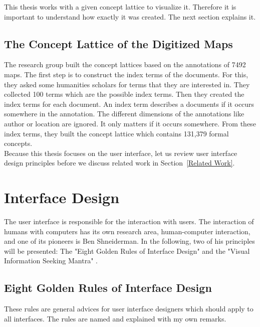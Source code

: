 \documentclass[11pt]{report}
\begin{document}
This thesis works with a given concept lattice to visualize it. Therefore it is important to understand how exactly it was created. The next section explains it.

\subsection{The Concept Lattice of the Digitized Maps}
\label{thedata}

The research group built the concept lattices based on the annotations of 7492 maps. The first step is to construct the index terms of the documents. For this, they asked some humanities scholars for terms that they are interested in. They collected 100 terms which are the possible index terms. Then they created the index terms for each document. An index term describes a documents if it occurs somewhere in the annotation. The different dimensions of the annotations like author or location are ignored. It only matters if it occurs somewhere. From these index terms, they built the concept lattice which contains 131,379 formal concepts.\\

Because this thesis focuses on the user interface, let us review user interface design principles before we discuss related work in Section~\ref{Related Work}.

\section{Interface Design}
\label{id}

The user interface is responsible for the interaction with users. The interaction of humans with computers has its own research area, human-computer interaction, and one of its pioneers is Ben Shneiderman. In the following, two of his principles will be presented: The "Eight Golden Rules of Interface Design" \cite{Shneiderman2010} and the "Visual Information Seeking Mantra" \cite{Shneiderman1996}.

\subsection{Eight Golden Rules of Interface Design}
\label{Golden}

These rules \cite{Shneiderman2010} are general advices for user interface designers which should apply to all interfaces. The rules are named and explained with my own remarks. \\
\end{document}
